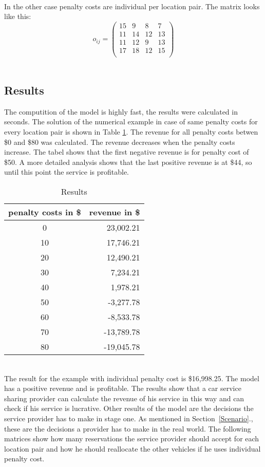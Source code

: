 \\
In the other case penalty costs are individual per location pair. The matrix looks like this:
\begin{equation*}
o_{i j}=
\begin{pmatrix}
15&9&8&7\\
11&14&12&13\\
11&12&9&13\\
17&18&12&15\\
\end{pmatrix}
\end{equation*}
\\
\subsection{Results}
The computition of the model is highly fast, the results were calculated in seconds. The solution of the numerical example in case of same penalty costs for every location pair is shown in Table \ref{tab:results}. The revenue for all penalty costs betwen \$0 and \$80 was calculated. The revenue decreases when the penalty costs increase. The tabel shows that the first negative revenue is for penalty cost of \$50. A more detailed analysis shows that the last positive revenue is at \$44, so until this point the service is profitable. \\
\begin{table}[h]
\centering
\begin{tabular}{c|r}
penalty costs in \$ & revenue in \$\\
\hline
0 & 23,002.21 \\
10 & 17,746.21 \\
20 & 12,490.21 \\
30 & 7,234.21 \\
40 & 1,978.21 \\
50 & -3,277.78 \\
60 & -8,533.78\\
70 & -13,789.78\\
80 & -19,045.78\\
\end{tabular}
\caption{Results}
\label{tab:results}
\end{table}
\\
The result for the example with individual penalty cost is \$16,998.25. The model has a positive revenue and is profitable. The results show that a car service sharing provider can calculate the revenue of his service in this way and can check if his service is lucrative. Other results of the model are the decisions the service provider has to make in stage one. As mentioned in Section~\ref{Scenario}., these are the decisions a provider has to make in the real world. The following matrices show how many reservations the service provider should accept for each location pair and how he should reallocate the other vehicles if he uses individual penalty cost.
